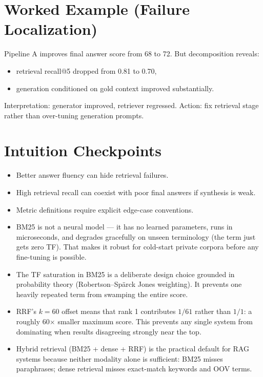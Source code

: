 \section*{Worked Example (Failure Localization)}
Pipeline A improves final answer score from 68 to 72.  
But decomposition reveals:
\begin{itemize}[leftmargin=1.5em]
  \item retrieval recall@5 dropped from 0.81 to 0.70,
  \item generation conditioned on gold context improved substantially.
\end{itemize}
Interpretation: generator improved, retriever regressed.  
Action: fix retrieval stage rather than over-tuning generation prompts.

\section*{Intuition Checkpoints}
\begin{itemize}[leftmargin=1.5em]
  \item Better answer fluency can hide retrieval failures.
  \item High retrieval recall can coexist with poor final answers if synthesis is weak.
  \item Metric definitions require explicit edge-case conventions.
  \item BM25 is not a neural model --- it has no learned parameters, runs in microseconds, and degrades gracefully on unseen terminology (the term just gets zero TF). That makes it robust for cold-start private corpora before any fine-tuning is possible.
  \item The TF saturation in BM25 is a deliberate design choice grounded in probability theory (Robertson--Sp\"{a}rck Jones weighting). It prevents one heavily repeated term from swamping the entire score.
  \item RRF's $k=60$ offset means that rank 1 contributes $1/61$ rather than $1/1$: a roughly 60$\times$ smaller maximum score. This prevents any single system from dominating when results disagreeing strongly near the top.
  \item Hybrid retrieval (BM25 + dense + RRF) is the practical default for RAG systems because neither modality alone is sufficient: BM25 misses paraphrases; dense retrieval misses exact-match keywords and OOV terms.
\end{itemize}

